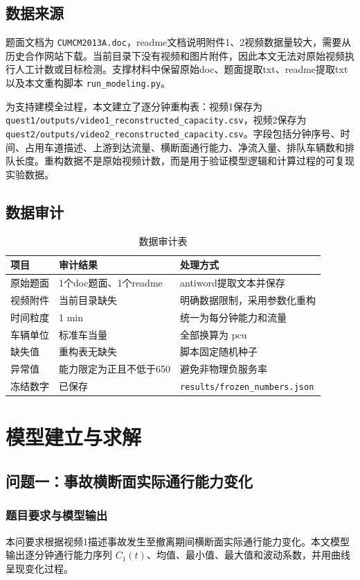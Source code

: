 \documentclass[UTF8,a4paper,12pt]{ctexart}
\newcommand{\pcu}{\mathrm{pcu}}
\begin{document}
\subsection{数据来源}
题面文档为 \verb|CUMCM2013A.doc|，readme文档说明附件1、2视频数据量较大，需要从历史合作网站下载。当前目录下没有视频和图片附件，因此本文无法对原始视频执行人工计数或目标检测。支撑材料中保留原始doc、题面提取txt、readme提取txt以及本文重构脚本 \verb|run_modeling.py|。

为支持建模全过程，本文建立了逐分钟重构表：视频1保存为 \verb|quest1/outputs/video1_reconstructed_capacity.csv|，视频2保存为 \verb|quest2/outputs/video2_reconstructed_capacity.csv|。字段包括分钟序号、时间、占用车道描述、上游到达流量、横断面通行能力、净流入量、排队车辆数和排队长度。重构数据不是原始视频计数，而是用于验证模型逻辑和计算过程的可复现实验数据。

\subsection{数据审计}
\begin{table}[H]
\centering
\caption{数据审计表}
\begin{tabular}{lll}
\toprule
项目 & 审计结果 & 处理方式\\
\midrule
原始题面 & 1个doc题面、1个readme & antiword提取文本并保存\\
视频附件 & 当前目录缺失 & 明确数据限制，采用参数化重构\\
时间粒度 & 1 min & 统一为每分钟能力和流量\\
车辆单位 & 标准车当量 & 全部换算为 $\pcu$\\
缺失值 & 重构表无缺失 & 脚本固定随机种子\\
异常值 & 能力限定为正且不低于650 & 避免非物理负服务率\\
冻结数字 & 已保存 & \verb|results/frozen_numbers.json|\\
\bottomrule
\end{tabular}
\end{table}

\section{模型建立与求解}
\subsection{问题一：事故横断面实际通行能力变化}
\subsubsection{题目要求与模型输出}
本问要求根据视频1描述事故发生至撤离期间横断面实际通行能力变化。本文模型输出逐分钟通行能力序列 $C_1(t)$、均值、最小值、最大值和波动系数，并用曲线呈现变化过程。
\end{document}
